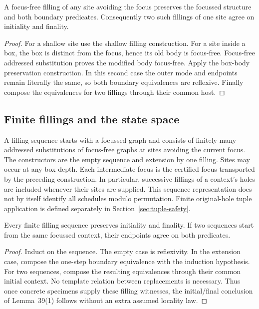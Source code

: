 \begin{lemma}
A focus-free filling of any site avoiding the focus preserves the focussed
structure and both boundary predicates. Consequently two such fillings of one
site agree on initiality and finality.
\end{lemma}
\begin{proof}
For a shallow site use the shallow filling construction. For a site inside a
box, the box is distinct from the focus, hence its old body is focus-free.
Focus-free addressed substitution proves the modified body focus-free. Apply
the box-body preservation construction. In this second case the outer mode and
endpoints remain literally the same, so both boundary equivalences are
reflexive. Finally compose the equivalences for two fillings through their
common host.
\end{proof}

\subsection{Finite fillings and the state space}
\begin{definition}\label{term:focus-fillings}
A filling sequence starts with a focussed graph and consists of finitely many
addressed substitutions of focus-free graphs at sites avoiding the current
focus. The constructors are the empty sequence and extension by one filling.
Sites may occur at any box depth. Each intermediate focus is the certified
focus transported by the preceding construction. In particular, successive
fillings of a context's holes are included whenever their sites are supplied.
This sequence representation does not by itself identify all schedules modulo
permutation. Finite original-hole tuple application is defined separately in
Section~\ref{sec:tuple-safety}.
\end{definition}

\begin{theorem}
Every finite filling sequence preserves initiality and finality. If two
sequences start from the same focussed context, their endpoints agree on both
predicates.
\end{theorem}
\begin{proof}
Induct on the sequence. The empty case is reflexivity. In the extension case,
compose the one-step boundary equivalence with the induction hypothesis. For
two sequences, compose the resulting equivalences through their common initial
context. No template relation between replacements is necessary. Thus once
concrete specimens supply these filling witnesses, the initial/final conclusion
of Lemma~39(1) follows without an extra assumed locality law.
\end{proof}

